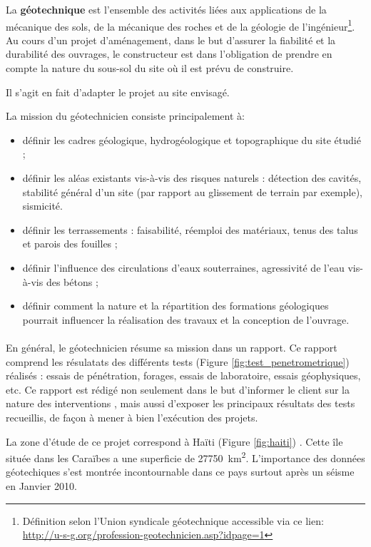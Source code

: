 \par 
La \textbf{géotechnique} est l’ensemble des 
activités liées aux applications de la mécanique des sols, de la mécanique 
des roches et de la géologie de l’ingénieur\footnote{
    Définition selon l’Union syndicale géotechnique accessible via ce lien: 
    \url{http://u-s-g.org/profession-geotechnicien.asp?idpage=1}}.
Au cours d'un projet d'aménagement, dans le but d'assurer  la fiabilité et la durabilité
des ouvrages, le constructeur est dans l'obligation de prendre en compte
la nature du sous-sol du site où il est prévu de construire.

Il s'agit en fait d'adapter le projet au site envisagé.
\par
La mission du géotechnicien consiste principalement à:
\begin{itemize}
    \item définir les cadres géologique, hydrogéologique et topographique 
    du site étudié ;
    \item définir les aléas existants vis-à-vis des risques naturels : 
    détection des cavités, stabilité général d’un site (par rapport au 
    glissement de terrain par exemple), sismicité.
    \item définir les terrassements : faisabilité, réemploi des matériaux, 
    tenus des talus et parois des fouilles ;
    \item définir l’influence des circulations d’eaux souterraines, 
    agressivité de l’eau vis-à-vis des bétons ;
    \item définir comment la nature et la répartition des 
    formations géologiques pourrait influencer la réalisation des travaux et la conception 
    de l’ouvrage.
\end{itemize}
\paragraph{}
En général, le géotechnicien résume sa mission dans un rapport.
Ce rapport comprend les résulatats des différents tests (Figure \ref{fig:test_penetrometrique}) réalisés : essais de pénétration, forages, essais de laboratoire,
essais géophysiques, etc.
Ce rapport est rédigé non seulement dans le but d’informer le client sur la nature des interventions
, mais aussi d’exposer les principaux résultats des tests recueillis, de façon à mener à bien
l’exécution des projets.
\par
La zone d'étude de ce projet correspond à Haïti (Figure \ref{fig:haiti}) .
Cette île située dans les Caraïbes a une superficie de  \SI{27750}{\kilo\metre\squared}.
L'importance des données géotechiques s'est montrée incontournable dans ce pays surtout 
après un séisme en Janvier 2010.

